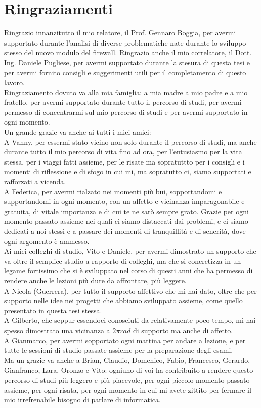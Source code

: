 \chapter*{Ringraziamenti}

Ringrazio innanzitutto il mio relatore, il Prof. Gennaro Boggia, per avermi supportato durante l'analisi di diverse
problematiche nate durante lo sviluppo stesso del nuovo modulo del firewall. Ringrazio anche il mio correlatore, il Dott. Ing. Daniele Pugliese,
per avermi supportato durante la stesura di questa tesi e per avermi fornito consigli e suggerimenti utili per il completamento
di questo lavoro.\\
Ringraziamento dovuto va alla mia famiglia: a mia madre a mio padre e a mio fratello, per avermi supportato durante tutto il percorso di studi,
per avermi permesso di concentrarmi sul mio percorso di studi e per avermi supportato in ogni momento.\\
Un grande grazie va anche ai tutti i miei amici:\\
A Vanny, per essermi stato vicino non solo durante il percorso di studi, ma anche durante tutto il mio percorso di vita fino ad ora, per l'entusiasmo
per la vita stessa, per i viaggi fatti assieme, per le risate ma sopratuttto per i consigli e i momenti di riflessione e di sfogo in cui
mi, ma sopratutto ci, siamo supportati e rafforzati a vicenda.\\
A Federica, per avermi rialzato nei momenti più bui, sopportandomi e supportandomi in ogni momento, con un affetto e vicinanza imparagonabile e gratuita,
di vitale importanza e di cui te ne sarò sempre grato. Grazie per ogni momento passato assieme nei quali ci siamo distaccati dai problemi, e ci siamo
dedicati a noi stessi e a passare dei momenti di tranquillità e di senerità, dove ogni argomento è ammesso.\\
Ai miei colleghi di studio, Vito e Daniele, per avermi dimostrato un supporto che va oltre il semplice studio a rapporto di colleghi, ma che si concretizza in un
legame fortissimo che si è sviluppato nel corso di questi anni che ha permesso di rendere anche le lezioni più dure da affrontare, più leggere.\\
A Nicola (Guerrera), per tutto il supporto affettivo che mi hai dato, oltre che per supporto nelle idee nei progetti che abbiamo sviluppato assieme,
come quello presentato in questa tesi stessa.\\
A Gilberto, che seppur essendoci conosciuti da relativamente poco tempo, mi hai spesso dimostrato una vicinanza a $2\pi rad$ di supporto ma anche di affetto.\\
A Gianmarco, per avermi sopportato ogni mattina per andare a lezione, e per tutte le sessioni di studio passate assieme per la preparazione degli esami.\\
Ma un grazie va anche a Brian, Claudio, Domenico, Fabio, Francesco, Gerardo, Gianfranco, Lara, Oronzo e Vito: ogniuno di voi ha contribuito a rendere
questo percorso di studi più leggero e più piacevole, per ogni piccolo momento passato assieme, per ogni risata, per ogni momento in cui
mi avete zittito per fermare il mio irrefrenabile bisogno di parlare di informatica.\\

